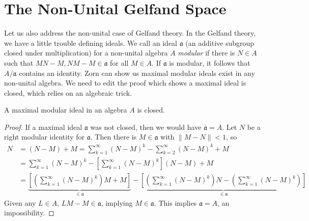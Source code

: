 \section{The Non-Unital Gelfand Space}

Let us also address the non-unital case of Gelfand theory. In the Gelfand theory, we have a little trouble defining ideals. We call an ideal $\mathfrak{a}$ (an additive subgroup closed under multiplication) for a non-unital algebra $A$ \emph{modular} if there is $N \in A$ such that $MN - M, NM - M \in \mathfrak{a}$ for all $M \in A$. If $\mathfrak{a}$ is modular, it follows that $A/\mathfrak{a}$ contains an identity. Zorn can show us maximal modular ideals exist in any non-unital algebra. We need to edit the proof which shows a maximal ideal is closed, which relies on an algebraic trick.

\begin{lemma}
    A maximal modular ideal in an algebra $A$ is closed.
\end{lemma}
\begin{proof}
    If a maximal ideal $\mathfrak{a}$ was not closed, then we would have $\overline{\mathfrak{a}} = A$. Let $N$ be a right modular identity for $\mathfrak{a}$. Then there is $M \in \mathfrak{a}$ with $\| M - N \| < 1$, so
    \begin{align*}
        N &= (N - M) + M = \sum_{k = 1}^\infty (N - M)^k - \sum_{k = 2}^\infty (N - M)^k + M\\
        &= \sum_{k = 1}^\infty (N - M)^k - \left[ \sum_{k = 1}^\infty (N - M)^k \right] (N - M) + M\\
        &= \underbrace{\left[ \left( \sum_{k = 1}^\infty (N - M)^k \right) M + M \right]}_{\in \mathfrak{a}} - \underbrace{\left[ \left( \sum_{k = 1}^\infty (N - M)^k \right) N - \left( \sum_{k = 1}^\infty (N - M)^k \right) \right]}_{\in \mathfrak{a}}
    \end{align*}
    Given any $L \in A$, $LM - M \in \mathfrak{a}$, implying $M \in \mathfrak{a}$. This implies $\mathfrak{a} = A$, an impossibility.
\end{proof}

